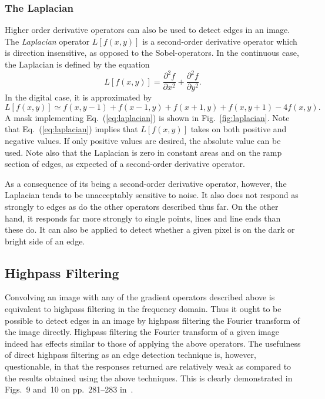 \subsubsection{The Laplacian}

Higher order derivative operators can also be used to detect edges in
an image.  The {\em Laplacian\/} operator $L[f(x,y)]$ is a
second-order derivative operator which is direction insensitive, as
opposed to the Sobel-operators.  In the continuous case, the Laplacian
is defined by the equation
\begin{equation}
  L[f(x,y)]=\frac{\partial^{2}f}{\partial x^{2}}+
  \frac{\partial^{2}f}{\partial y^{2}}\mbox{.}
\end{equation}
In the digital case, it is approximated by
\begin{equation}
\label{eq:laplacian}
  L[f(x,y)]\simeq f(x,y-1)+f(x-1,y)+f(x+1,y)+f(x,y+1)-4f(x,y)\mbox{.}
\end{equation}
A mask implementing Eq.~(\ref{eq:laplacian}) is shown in
Fig.~\ref{fig:laplacian}.  Note that Eq.~(\ref{eq:laplacian}) implies
that $L[f(x,y)]$ takes on both positive and negative values.  If only
positive values are desired, the absolute value can be used.  Note
also that the Laplacian is zero in constant areas and on the ramp
section of edges, as expected of a second-order derivative operator.

As a consequence of its being a second-order derivative operator,
however, the Laplacian tends to be unacceptably sensitive to noise.
It also does not respond as strongly to edges as do the other
operators described thus far.  On the other hand, it responds far more
strongly to single points, lines and line ends than these do.  It can
also be applied to detect whether a given pixel is on the dark or
bright side of an edge.


\subsection{Highpass Filtering}
\label{image:edge:highpass}

Convolving an image with any of the gradient operators described above
is equivalent to highpass filtering in the frequency domain.  Thus it
ought to be possible to detect edges in an image by highpass filtering
the Fourier transform of the image directly.  Highpass filtering the
Fourier transform of a given image indeed has effects similar to those
of applying the above operators.  The usefulness of direct highpass
filtering as an edge detection technique is, however, questionable, in
that the responses returned are relatively weak as compared to the
results obtained using the above techniques.  This is clearly
demonstrated in Figs.~9 and~10 on pp.~281--283 in~\cite{digpic}.

